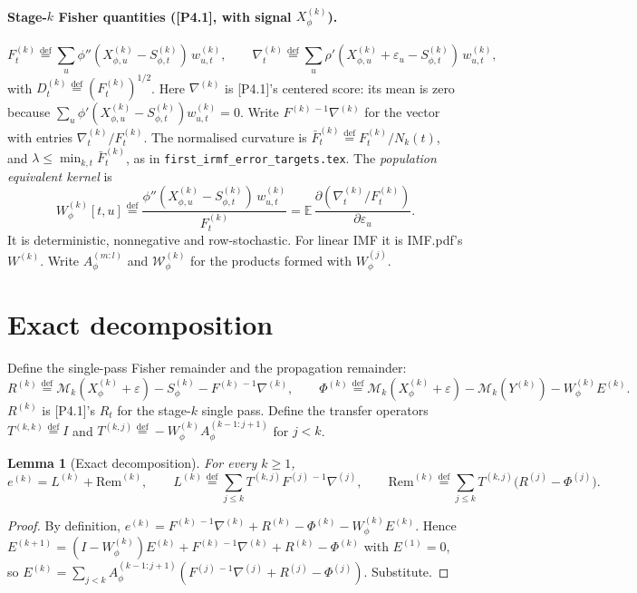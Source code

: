 \documentclass[11pt]{article}
\newcommand{\E}{\mathbb{E}}
\newcommand{\defeq}{\stackrel{\mathrm{def}}{=}}
\newcommand{\Rem}{\mathrm{Rem}}
\newcommand{\Wcal}{\mathcal W}
\newtheorem{lemma}[proposition]{Lemma}
\theoremstyle{definition}
\begin{document}
\paragraph{Stage-\(k\) Fisher quantities ([P4.1], with signal \(X^{(k)}_\phi\)).}
\[
  F^{(k)}_t\defeq\sum_u\phi''(X^{(k)}_{\phi,u}-S^{(k)}_{\phi,t})\,w^{(k)}_{u,t},
  \qquad
  \nabla^{(k)}_t\defeq\sum_u\rho'(X^{(k)}_{\phi,u}+\varepsilon_u-S^{(k)}_{\phi,t})\,w^{(k)}_{u,t},
\]
with \(D^{(k)}_t\defeq(F^{(k)}_t)^{1/2}\).  Here \(\nabla^{(k)}\) is
[P4.1]'s centered score: its mean is zero because
\(\sum_u\phi'(X^{(k)}_{\phi,u}-S^{(k)}_{\phi,t})w^{(k)}_{u,t}=0\).  Write
\(F^{(k)\,-1}\nabla^{(k)}\) for the vector with entries
\(\nabla^{(k)}_t/F^{(k)}_t\).  The normalised curvature is
\(\bar F^{(k)}_t\defeq F^{(k)}_t/N_k(t)\), and \(\lambda\le\min_{k,t}\bar
F^{(k)}_t\), as in \texttt{first\_irmf\_error\_targets.tex}.  The
\emph{population equivalent kernel} is
\[
  W^{(k)}_\phi[t,u]\defeq\frac{\phi''(X^{(k)}_{\phi,u}-S^{(k)}_{\phi,t})\,w^{(k)}_{u,t}}{F^{(k)}_t}
  =\E\,\frac{\partial(\nabla^{(k)}_t/F^{(k)}_t)}{\partial\varepsilon_u}.
\]
It is deterministic, nonnegative and row-stochastic.  For linear IMF it is
IMF.pdf's \(W^{(k)}\).  Write \(A^{(m:l)}_\phi\) and \(\Wcal^{(k)}_\phi\) for
the products formed with \(W^{(j)}_\phi\).

\section{Exact decomposition}

Define the single-pass Fisher remainder and the propagation remainder:
\[
  R^{(k)}\defeq\mathcal M_k(X^{(k)}_\phi+\varepsilon)-S^{(k)}_\phi-F^{(k)\,-1}\nabla^{(k)},
  \qquad
  \Phi^{(k)}\defeq\mathcal M_k(X^{(k)}_\phi+\varepsilon)-\mathcal M_k(Y^{(k)})-W^{(k)}_\phi E^{(k)} .
\]
\(R^{(k)}\) is [P4.1]'s \(R_t\) for the stage-\(k\) single pass.  Define the
transfer operators
\(T^{(k,k)}\defeq I\) and \(T^{(k,j)}\defeq-W^{(k)}_\phi A^{(k-1:j+1)}_\phi\)
for \(j<k\).

\begin{lemma}[Exact decomposition]\label{lem:exact}
For every \(k\ge1\),
\[
  e^{(k)}=L^{(k)}+\Rem^{(k)},\qquad
  L^{(k)}\defeq\sum_{j\le k}T^{(k,j)}F^{(j)\,-1}\nabla^{(j)},\qquad
  \Rem^{(k)}\defeq\sum_{j\le k}T^{(k,j)}\bigl(R^{(j)}-\Phi^{(j)}\bigr).
\]
\end{lemma}

\begin{proof}
By definition,
\(e^{(k)}=F^{(k)\,-1}\nabla^{(k)}+R^{(k)}-\Phi^{(k)}-W^{(k)}_\phi E^{(k)}\).
Hence
\(E^{(k+1)}=(I-W^{(k)}_\phi)E^{(k)}+F^{(k)\,-1}\nabla^{(k)}+R^{(k)}-\Phi^{(k)}\)
with \(E^{(1)}=0\), so
\(E^{(k)}=\sum_{j<k}A^{(k-1:j+1)}_\phi(F^{(j)\,-1}\nabla^{(j)}+R^{(j)}-\Phi^{(j)})\).
Substitute.
\end{proof}
\end{document}
